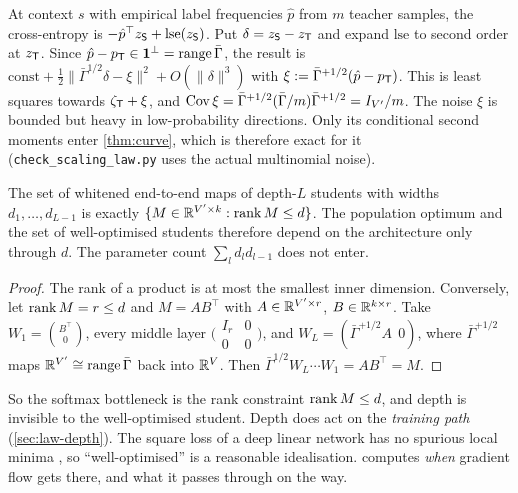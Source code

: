 \begin{remark}\label{rem:hardlin}
\Mo At context $s$ with empirical label frequencies $\hat p$ from $m$ teacher samples, the cross-entropy is
$-\hat p^\top z_{\mathsf{S}}+\mathrm{lse}(z_{\mathsf{S}})$. Put $\delta=z_{\mathsf{S}}-z_{\mathsf{T}}$ and expand $\mathrm{lse}$ to second order at $z_{\mathsf{T}}$. Since
$\hat p-p_{\mathsf{T}}\in\mathbf{1}^\perp=\operatorname{range}\bar\Gamma$, the result is
$\mathrm{const}+\frac12\|\bar\Gamma^{1/2}\delta-\xi\|^2+O(\|\delta\|^3)$ with $\xi:=\bar\Gamma^{+1/2}(\hat p-p_{\mathsf{T}})$. This is least squares
towards $\zeta_{\mathsf{T}}+\xi$, and $\operatorname{Cov}\xi=\bar\Gamma^{+1/2}(\bar\Gamma/m)\bar\Gamma^{+1/2}=I_{V'}/m$. The noise $\xi$ is bounded but heavy in
low-probability directions. Only its conditional second moments enter \cref{thm:curve}, which is
therefore exact for it (\texttt{check\_scaling\_law.py} uses the actual multinomial noise).
\end{remark}

\begin{lemma}\label{lem:deeplin}
\Pv\Ck The set of whitened end-to-end maps of depth-$L$ students with widths $d_1,\dots,d_{L-1}$ is exactly
$\{M\in\mathbb{R}^{V'\times k}:\operatorname{rank} M\le d\}$. The population optimum and the set of well-optimised students
therefore depend on the architecture only through $d$. The parameter count $\sum_ld_ld_{l-1}$ does not enter.
\end{lemma}
\begin{proof}
The rank of a product is at most the smallest inner dimension. Conversely, let $\operatorname{rank} M=r\le d$ and
$M=AB^\top$ with $A\in\mathbb{R}^{V'\times r}$, $B\in\mathbb{R}^{k\times r}$. Take $W_1=\binom{B^\top}{0}$, every middle layer
$\bigl(\begin{smallmatrix}I_r&0\\0&0\end{smallmatrix}\bigr)$, and $W_L=(\bar\Gamma^{+1/2}A\ \ 0)$, where
$\bar\Gamma^{+1/2}$ maps $\mathbb{R}^{V'}\cong\operatorname{range}\bar\Gamma$ back into $\mathbb{R}^V$. Then $\bar\Gamma^{1/2}W_L\cdots W_1=AB^\top=M$.
\end{proof}
\noindent
So the softmax bottleneck is the rank constraint $\operatorname{rank} M\le d$, and depth is invisible to the
well-optimised student. Depth does act on the \emph{training path} (\cref{sec:law-depth}). The square
loss of a deep linear network has no spurious local minima \citep{baldi1989neural,kawaguchi2016deep}, so
``well-optimised'' is a reasonable idealisation.  computes \emph{when} gradient flow gets there,
and what it passes through on the way.


